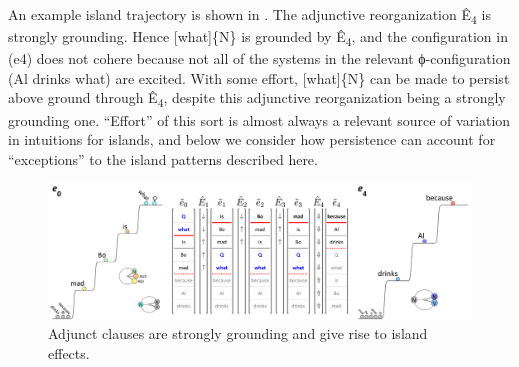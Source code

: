 \begin{table}
\caption{Reorganization grounding propensity and island effects.}\label{tab:7:5}
\end{table}

  An example island trajectory is shown in {}. The adjunctive reorganization Ê\textsubscript{4} is strongly grounding. Hence [what]\{N\} is grounded by Ê\textsubscript{4}, and the configuration in (e4) does not cohere because not all of the systems in the relevant ϕ-con\-fig\-u\-ra\-tion ({\textbar}Al drinks what{\textbar}) are excited. With some effort, [what]\{N\} can be made to persist above ground through Ê\textsubscript{4}, despite this adjunctive reorganization being a strongly grounding one. “Effort” of this sort is almost always a relevant source of variation in  intuitions for islands, and below we consider how persistence can account for “exceptions” to the island patterns described here.

  
\begin{figure}
\includegraphics[width=\textwidth]{figures/Tilsen-img163.png}
\caption{Adjunct clauses are strongly grounding and give rise to island effects.}
\label{fig:7:19}
\end{figure}
 

